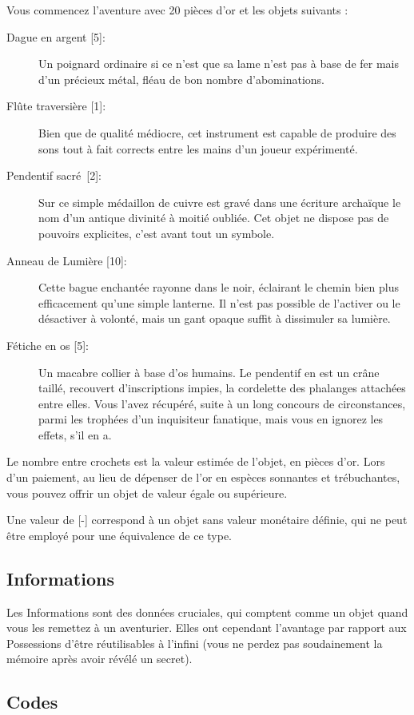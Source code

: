 \documentclass{report}
\begin{document}
Vous commencez l'aventure avec 20 pièces d'or et les objets suivants :
\begin{description}
\item[{Dague en argent [5]}:] Un poignard ordinaire si ce n'est que sa lame n'est pas à base de fer mais d'un précieux métal, fléau de bon nombre d'abominations.
\item[{Flûte traversière [1]}:] Bien que de qualité médiocre, cet instrument est capable de produire des sons tout à fait corrects entre les mains d'un joueur expérimenté.
\item[{Pendentif sacré [2]}:] Sur ce simple médaillon de cuivre est gravé dans une écriture archaïque le nom d'un antique divinité à moitié oubliée. Cet objet ne dispose pas de pouvoirs explicites, c'est avant tout un symbole.
\item[{Anneau de Lumière [10]}:] Cette bague enchantée rayonne dans le noir, éclairant le chemin bien plus  efficacement qu'une simple lanterne. Il n'est pas possible de l'activer ou le désactiver à volonté, mais un gant opaque suffit à dissimuler sa lumière.
\item[{Fétiche en os [5]}:] Un macabre collier à base d'os humains. Le pendentif en est un crâne taillé, recouvert d'inscriptions impies, la cordelette des phalanges attachées entre elles. Vous l'avez récupéré, suite à un long concours de circonstances, parmi les trophées d'un inquisiteur fanatique, mais vous en ignorez les effets, s'il en a.
\end{description}

Le nombre entre crochets est la valeur estimée de l'objet, en pièces d'or. Lors d'un paiement, au lieu de dépenser de l'or en espèces sonnantes et trébuchantes, vous pouvez offrir un objet de valeur égale ou supérieure.

Une valeur de [-] correspond à un objet sans valeur monétaire définie, qui ne peut être employé pour une équivalence de ce type.

\subsection{Informations}

Les Informations sont des données cruciales, qui comptent comme un objet quand vous les remettez à un aventurier. Elles ont cependant l'avantage par rapport aux Possessions d'être réutilisables à l'infini (vous ne perdez pas soudainement la mémoire après avoir révélé un secret).

\subsection{Codes}
\end{document}
